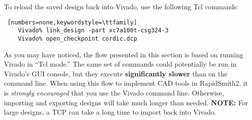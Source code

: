 \noindent To reload the saved design back into Vivado, use the following Tcl
commands:

\begin{lstlisting} [numbers=none,keywordstyle=\ttfamily]
	Vivado% link_design -part xc7a100t-csg324-3
	Vivado% open_checkpoint cordic.dcp
\end{lstlisting}

As you may have noticed, the flow presented in this section is based on running
Vivado in ``Tcl mode.'' The same set of commands could potentially be run in
Vivado's GUI console, but they execute \textbf{significantly slower} than on
the command line. When using this flow to implement CAD tools in RapidSmith2,
it is \textit{strongly encouraged} that you use the Vivado command line.
Otherwise, importing and exporting designs will take much longer than needed.
\textbf{NOTE:} For large designs, a TCP can take a long time to import back into
Vivado. 
